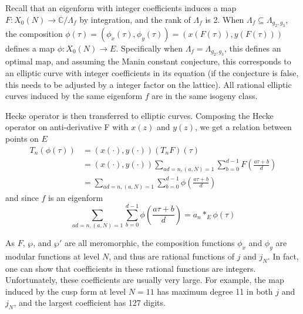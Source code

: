 \documentclass[]{article}
\begin{document}
Recall that an eigenform with integer coefficients induces a map $F: X_0(N) \to \mathbb{C} / \Lambda_f$ by integration, and the rank of $\Lambda_f$ is 2. When $\Lambda_f\subseteq\Lambda_{g_2,g_3}$, the composition $\phi(\tau) = (\phi_x(\tau), \phi_y(\tau)) = (x(F(\tau)), y(F(\tau)))$ defines a map $\phi: X_0(N)\to E$. Specifically when $\Lambda_f=\Lambda_{g_2,g_3}$, this defines an optimal map, and assuming the Manin constant conjecture, this corresponds to an elliptic curve with integer coefficients in its equation (if the conjecture is false, this needs to be adjusted by a integer factor on the lattice). All rational elliptic curves induced by the same eigenform $f$ are in the same isogeny class.

Hecke operator is then transferred to elliptic curves. Composing the Hecke operator on anti-derivative F with $x(z)$ and $y(z)$, we get a relation between points on $E$
\begin{align*}
T_n(\phi(\tau)) &= (x(\cdot), y(\cdot)) (T_n F) (\tau) \\
&= (x(\cdot), y(\cdot))  \sum_{ad=n, (a,N) = 1}  \sum_{b = 0}^{d - 1}  F\left(\frac{a\tau+b}{d}\right) \\
&= \sum_{ad=n, (a,N) = 1}  \sum_{b = 0}^{d - 1} \phi\left(\frac{a\tau+b}{d}\right)
\end{align*}
and since $f$ is an eigenform
\[
\sum_{ad=n, (a,N) = 1}  \sum_{b = 0}^{d - 1} \phi\left(\frac{a\tau+b}{d}\right) = a_n *_E \phi(\tau)
\]

As $F$, $\wp$, and $\wp'$ are all meromorphic, the composition functions $\phi_x$ and $\phi_y$ are modular functions at level $N$, and thus are rational functions of $j$ and $j_N$. In fact, one can show that coefficients in these rational functions are integers. Unfortunately, these coefficients are usually very large. For example, the map induced by the cusp form at level $N = 11$ has maximum degree 11 in both $j$ and $j_N$, and the largest coefficient has 127 digits.
\end{document}
